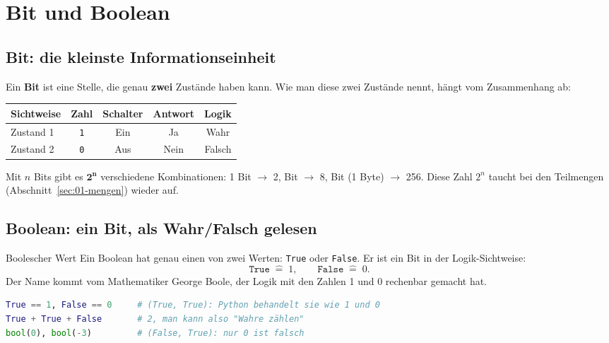 \section{Bit und Boolean}

\subsection*{Bit: die kleinste Informationseinheit}
Ein \textbf{Bit} ist eine Stelle, die genau \textbf{zwei} Zustände haben kann.
Wie man diese zwei Zustände nennt, hängt vom Zusammenhang ab:

\begin{center}
  \begin{tabular}{lcccc}
    \toprule
    Sichtweise & Zahl & Schalter & Antwort & Logik \\
    \midrule
    Zustand 1 & \texttt{1} & Ein & Ja & Wahr \\
    Zustand 2 & \texttt{0} & Aus & Nein & Falsch \\
    \bottomrule
  \end{tabular}
\end{center}

\begin{merke}
  Mit $n$ Bits gibt es $\mathbf{2^n}$ verschiedene Kombinationen:
  1 Bit $\to$ 2,  Bit $\to$ 8,  Bit (1 Byte) $\to$ 256.
  Diese Zahl $2^n$ taucht bei den Teilmengen (Abschnitt~\ref{sec:01-mengen}) wieder auf.
\end{merke}

\subsection*{Boolean: ein Bit, als Wahr/Falsch gelesen}
\begin{definition}{Boolescher Wert}
  Ein Boolean hat genau einen von zwei Werten: \texttt{True} oder \texttt{False}.
  Er ist ein Bit in der Logik-Sichtweise:
  \[
    \texttt{True} \;\widehat{=}\; 1, \qquad \texttt{False} \;\widehat{=}\; 0.
  \]
  Der Name kommt vom Mathematiker George Boole, der Logik mit den Zahlen 1 und 0
  rechenbar gemacht hat.
\end{definition}

\begin{lstlisting}[language=Python]
True == 1, False == 0     # (True, True): Python behandelt sie wie 1 und 0
True + True + False       # 2, man kann also "Wahre zählen"
bool(0), bool(-3)         # (False, True): nur 0 ist falsch
\end{lstlisting}

